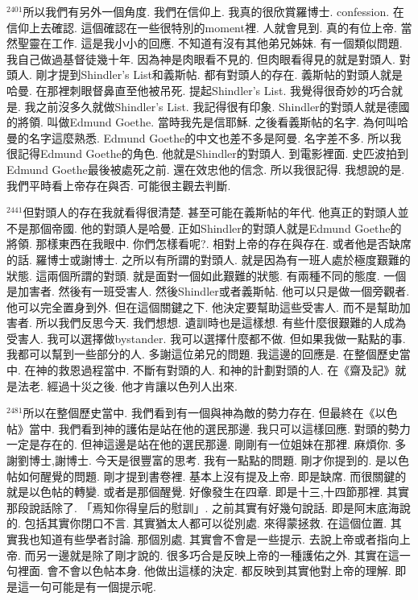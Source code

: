 \documentclass{book}
\begin{document}
$^{2401}$所以我們有另外一個角度.
我們在信仰上.
我真的很欣賞羅博士.
confession.
在信仰上去確認.
這個確認在一些很特別的moment裡.
人就會見到.
真的有位上帝.
當然聖靈在工作.
這是我小小的回應.
不知道有沒有其他弟兄姊妹.
有一個類似問題.
我自己做過基督徒幾十年.
因為神是肉眼看不見的.
但肉眼看得見的就是對頭人.
對頭人.
剛才提到Shindler's List和義斯帖.
都有對頭人的存在.
義斯帖的對頭人就是哈曼.
在那裡刺眼督鼻直至他被吊死.
提起Shindler's List.
我覺得很奇妙的巧合就是.
我之前沒多久就做Shindler's List.
我記得很有印象.
Shindler的對頭人就是德國的將領.
叫做Edmund Goethe.
當時我先是信耶穌.
之後看義斯帖的名字.
為何叫哈曼的名字這麼熟悉.
Edmund Goethe的中文也差不多是阿曼.
名字差不多.
所以我很記得Edmund Goethe的角色.
他就是Shindler的對頭人.
到電影裡面.
史匹波拍到Edmund Goethe最後被處死之前.
還在效忠他的信念.
所以我很記得.
我想說的是.
我們平時看上帝存在與否.
可能很主觀去判斷.

$^{2441}$但對頭人的存在我就看得很清楚.
甚至可能在義斯帖的年代.
他真正的對頭人並不是那個帝國.
他的對頭人是哈曼.
正如Shindler的對頭人就是Edmund Goethe的將領.
那樣東西在我眼中.
你們怎樣看呢?.
相對上帝的存在與存在.
或者他是否缺席的話.
羅博士或謝博士.
之所以有所謂的對頭人.
就是因為有一班人處於極度艱難的狀態.
這兩個所謂的對頭.
就是面對一個如此艱難的狀態.
有兩種不同的態度.
一個是加害者.
然後有一班受害人.
然後Shindler或者義斯帖.
他可以只是做一個旁觀者.
他可以完全置身到外.
但在這個關鍵之下.
他決定要幫助這些受害人.
而不是幫助加害者.
所以我們反思今天.
我們想想.
遺訓時也是這樣想.
有些什麼很艱難的人成為受害人.
我可以選擇做bystander.
我可以選擇什麼都不做.
但如果我做一點點的事.
我都可以幫到一些部分的人.
多謝這位弟兄的問題.
我這邊的回應是.
在整個歷史當中.
在神的救恩過程當中.
不斷有對頭的人.
和神的計劃對頭的人.
在《齋及記》就是法老.
經過十災之後.
他才肯讓以色列人出來.

$^{2481}$所以在整個歷史當中.
我們看到有一個與神為敵的勢力存在.
但最終在《以色帖》當中.
我們看到神的護佑是站在他的選民那邊.
我只可以這樣回應.
對頭的勢力一定是存在的.
但神這邊是站在他的選民那邊.
剛剛有一位姐妹在那裡.
麻煩你.
多謝劉博士,謝博士.
今天是很豐富的思考.
我有一點點的問題.
剛才你提到的.
是以色帖如何醒覺的問題.
剛才提到書卷裡.
基本上沒有提及上帝.
即是缺席.
而很關鍵的就是以色帖的轉變.
或者是那個醒覺.
好像發生在四章.
即是十三,十四節那裡.
其實那段說話除了.
「焉知你得皇后的慰訓」.
之前其實有好幾句說話.
即是阿末底海說的.
包括其實你閉口不言.
其實猶太人都可以從別處.
來得蒙拯救.
在這個位置.
其實我也知道有些學者討論.
那個別處.
其實會不會是一些提示.
去說上帝或者指向上帝.
而另一邊就是除了剛才說的.
很多巧合是反映上帝的一種護佑之外.
其實在這一句裡面.
會不會以色帖本身.
他做出這樣的決定.
都反映到其實他對上帝的理解.
即是這一句可能是有一個提示呢.
\end{document}
